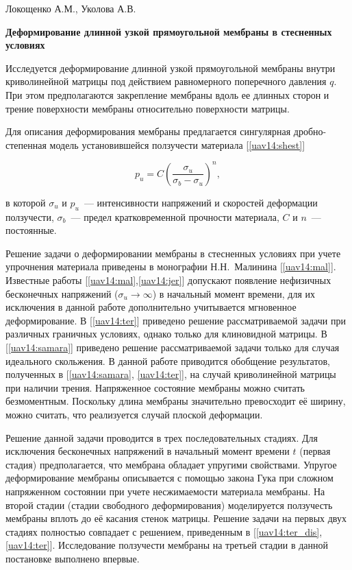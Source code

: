 \documentclass[a4paper,12pt, openany]{memoir}
\numberwithin{equation}{chapter}
\numberwithin{figure}{chapter}
\begin{document}
\begin{center}
Локощенко А.М., Уколова А.В.

{\textbf{Деформирование длинной узкой прямоугольной мембраны в стесненных условиях}}
\end{center}

Исследуется деформирование длинной узкой прямоугольной мембраны внутри криволинейной матрицы под действием равномерного поперечного
давления $q$. При этом предполагаются закрепление мембраны вдоль ее длинных сторон и трение поверхности мембраны относительно поверхности матрицы.

Для описания деформирования мембраны предлагается сингулярная дробно-степенная модель установившейся ползучести материала [\ref{uav14:shest}]


\begin{equation}
\textit{\.{p}}_u = C \left( \frac{\sigma_u}{\sigma_b - \sigma_u} \right)^n,
\label{uav14:f1}
\end{equation}

в которой $\sigma_u$ и $\textit{\.{p}}_u$~--- интенсивности напряжений и скоростей деформации ползучести, $\sigma_b$~--- предел кратковременной прочности материала, $C$ и $n$~--- постоянные.

Решение задачи о деформировании мембраны в стесненных условиях при учете упрочнения материала приведены в монографии Н.Н.~Малинина [\ref{uav14:mal}]. Известные работы [\ref{uav14:mal},\ref{uav14:jer}] допускают появление нефизичных бесконечных напряжений ($\sigma_u \to \infty$) в начальный момент времени, для их исключения в данной работе дополнительно учитывается мгновенное деформирование. В [\ref{uav14:ter}] приведено решение рассматриваемой задачи при различных граничных условиях, однако только для клиновидной матрицы. В [\ref{uav14:samara}] приведено решение рассматриваемой задачи только для случая идеального скольжения. В данной работе приводится обобщение результатов, полученных в [\ref{uav14:samara}, \ref{uav14:ter}], на случай криволинейной матрицы при наличии трения. Напряженное состояние мембраны можно считать безмоментным. Поскольку длина мембраны значительно превосходит её ширину, можно считать, что реализуется случай плоской деформации.

Решение данной задачи проводится в трех последовательных стадиях. Для исключения бесконечных напряжений в начальный момент времени $t$ (первая стадия) предполагается, что мембрана обладает упругими свойствами. Упругое деформирование мембраны описывается с помощью
закона Гука при сложном напряженном состоянии при учете несжимаемости материала мембраны. На второй стадии (стадии свободного деформирования) моделируется ползучесть мембраны вплоть до её касания стенок матрицы. Решение задачи на первых двух стадиях полностью совпадает с решением,
приведенным в [\ref{uav14:ter_dis}, \ref{uav14:ter}]. Исследование ползучести мембраны на третьей стадии в данной постановке выполнено впервые.
\end{document}
